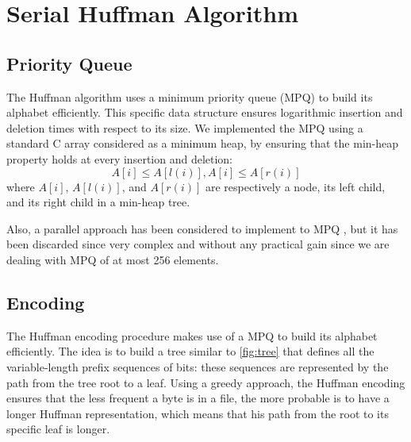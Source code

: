 \section{Serial Huffman Algorithm}
\subsection{Priority Queue}
The Huffman algorithm uses a minimum priority queue (MPQ) to build its alphabet efficiently. This specific data structure ensures logarithmic insertion and deletion times with respect to its size.
We implemented the MPQ using a standard C array considered as a minimum heap, by ensuring that the min-heap property holds at every insertion and deletion:
\begin{equation}
    A[i] \le A[l(i)], A[i] \le A[r(i)]
\end{equation}
where \(A[i]\), \(A[l(i)]\), and \(A[r(i)]\) are respectively a node, its left child, and its right child in a min-heap tree.

Also, a parallel approach has been considered to implement to MPQ \cite{BRODAL19984}, but it has been discarded since very complex and without any practical gain since we are dealing with MPQ of at most 256 elements.

\subsection{Encoding}
The Huffman encoding procedure makes use of a MPQ to build its alphabet efficiently. The idea is to build a tree similar to \cref{fig:tree} that defines all the variable-length prefix sequences of bits: these sequences are represented by the path from the tree root to a leaf. Using a greedy approach, the Huffman encoding ensures that the less frequent a byte is in a file, the more probable is to have a longer Huffman representation, which means that his path from the root to its specific leaf is longer.

